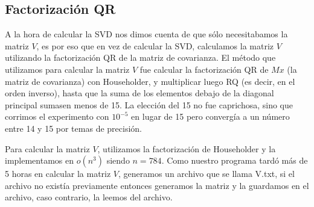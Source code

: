 \subsection{Factorizaci\'on QR}
A la hora de calcular la SVD nos dimos cuenta de que s\'olo necesitabamos la matriz $V$, es por eso que en vez de calcular la SVD, calculamos la matriz $V$ utilizando la factorizaci\'on QR de la matriz de covarianza. El m\'etodo que utilizamos para calcular la matriz $V$ fue calcular la factorizaci\'on QR de $Mx$ (la matriz de covarianza) con Householder, y multiplicar luego RQ (es decir, en el orden inverso), hasta que la suma de los elementos debajo de la diagonal principal sumasen menos de 15. La elecci\'on del 15 no fue caprichosa, sino que corrimos el experimento con $10^{-5}$ en lugar de 15 pero converg\'ia a un n\'umero entre 14 y 15 por temas de precisi\'on.

Para calcular la matriz $V$, utilizamos la factorizaci\'on de Householder y la implementamos en $o(n^3)$ siendo $n = 784$. Como nuestro programa tard\'o m\'as de 5 horas en calcular la matriz $V$, generamos un archivo que se llama V.txt, si el archivo no exist\'ia previamente entonces generamos la matriz y la guardamos en el archivo, caso contrario, la leemos del archivo.
